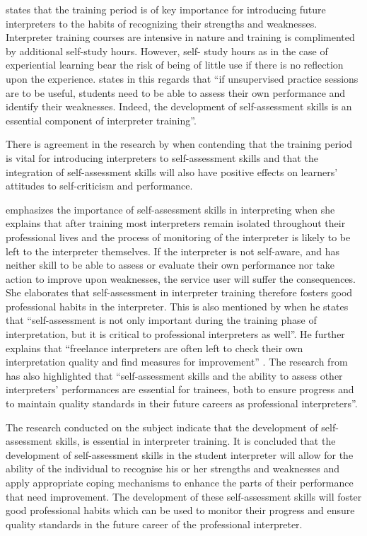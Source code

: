 \documentclass[output=paper]{langsci/langscibook}
\begin{document}
\citet{Riccardi2002} states that the training period is of key importance for introducing future interpreters to the habits of recognizing their strengths and weaknesses. Interpreter training courses are intensive in nature and training is complimented by additional self-study hours. However, self- study hours as in the case of experiential learning bear the risk of being of little use if there is no reflection upon the experience. \citet[4]{Sandrelli2007a} states in this regards that “if unsupervised practice sessions are to be useful, students need to be able to assess their own performance and identify their weaknesses. Indeed, the development of self-assessment skills is an essential component of interpreter training”. 

There is agreement in the research by \citet[197]{Pinazo2008} when contending that the training period is vital for introducing interpreters to self-assessment skills and that the integration of self-assessment skills will also have positive effects on learners’ attitudes to self-criticism and performance. 

\citet[254]{Fowler2007} emphasizes the importance of self-assessment skills in interpreting when she explains that after training most interpreters remain isolated throughout their professional lives and the process of monitoring of the interpreter is likely to be left to the interpreter themselves. If the interpreter is not self-aware, and has neither skill to be able to assess or evaluate their own performance nor take action to improve upon weaknesses, the service user will suffer the consequences. She elaborates that self-assessment in interpreter training therefore fosters good professional habits in the interpreter. This is also mentioned by \citet[3]{Lee2005} when he states that “self-assessment is not only important during the training phase of interpretation, but it is critical to professional interpreters as well”. He further explains that “freelance interpreters are often left to check their own interpretation quality and find measures for improvement” \citep[2]{Lee2005}. The research from \citet[15]{Sandrelli2007a} has also highlighted that “self-assessment skills and the ability to assess other interpreters’ performances are essential for trainees, both to ensure progress and to maintain quality standards in their future careers as professional interpreters”.

The research conducted on the subject \citep{Riccardi2002,Lee2005,Sandrelli2007a,Fowler2007,Pinazo2008} indicate that the development of self-assessment skills, is essential in interpreter training. It is concluded that the development of self-assessment skills in the student interpreter will allow for the ability of the individual to recognise his or her strengths and weaknesses and apply appropriate coping mechanisms to enhance the parts of their performance that need improvement. The development of these self-assessment skills will foster good professional habits which can be used to monitor their progress and ensure quality standards in the future career of the professional interpreter. 
\end{document}
